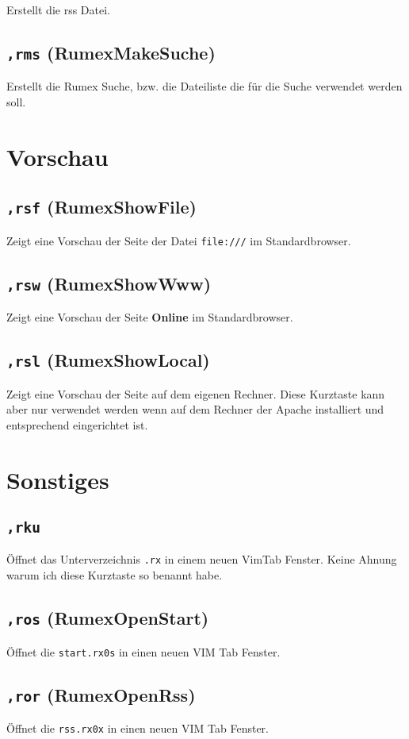 Erstellt die rss Datei.

\subsection{\texttt{,rms} (RumexMakeSuche)}\label{rms-rumexmakesuche}

Erstellt die Rumex Suche, bzw. die Dateiliste die für die Suche
verwendet werden soll.

\section{Vorschau}\label{vorschau}

\subsection{\texttt{,rsf} (RumexShowFile)}\label{rsf-rumexshowfile}

Zeigt eine Vorschau der Seite der Datei \texttt{file:///} im
Standardbrowser.

\subsection{\texttt{,rsw} (RumexShowWww)}\label{rsw-rumexshowwww}

Zeigt eine Vorschau der Seite \textbf{Online} im Standardbrowser.

\subsection{\texttt{,rsl} (RumexShowLocal)}\label{rsl-rumexshowlocal}

Zeigt eine Vorschau der Seite auf dem eigenen Rechner. Diese Kurztaste
kann aber nur verwendet werden wenn auf dem Rechner der Apache
installiert und entsprechend eingerichtet ist.

\section{Sonstiges}\label{sonstiges}

\subsection{\texttt{,rku}}\label{rku}

Öffnet das Unterverzeichnis \texttt{.rx} in einem neuen VimTab Fenster.
Keine Ahnung warum ich diese Kurztaste so benannt habe.

\subsection{\texttt{,ros} (RumexOpenStart)}\label{ros-rumexopenstart}

Öffnet die \texttt{start.rx0s} in einen neuen VIM Tab Fenster.

\subsection{\texttt{,ror} (RumexOpenRss)}\label{ror-rumexopenrss}

Öffnet die \texttt{rss.rx0x} in einen neuen VIM Tab Fenster.
